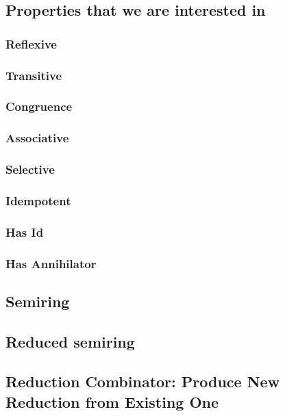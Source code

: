 \documentclass[11pt]{article}
\begin{document}
\subsection{Properties that we are interested in}
\subsubsection{Reflexive}
\subsubsection{Transitive}
\subsubsection{Congruence}
\subsubsection{Associative}
\subsubsection{Selective}
\subsubsection{Idempotent}
\subsubsection{Has Id}
\subsubsection{Has Annihilator}
\subsection{Semiring}
\subsection{Reduced semiring}
\subsection{Reduction Combinator: Produce New Reduction from Existing One}
\end{document}
